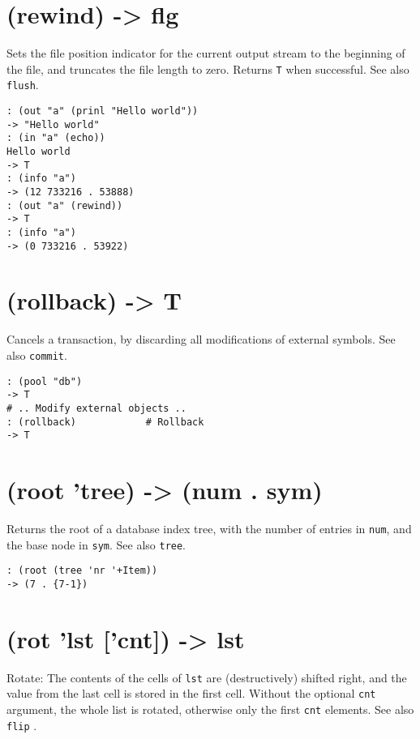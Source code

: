 {{{{{{{{ 
\section{(rewind) -> flg}
\label{sec-8-1-18-26}


Sets the file position indicator for the current output stream to the
beginning of the file, and truncates the file length to zero. Returns
\texttt{T} when successful. See also \texttt{flush}.


\begin{verbatim}
: (out "a" (prinl "Hello world"))
-> "Hello world"
: (in "a" (echo))
Hello world
-> T
: (info "a")
-> (12 733216 . 53888)
: (out "a" (rewind))
-> T
: (info "a")
-> (0 733216 . 53922)
\end{verbatim}

 
\section{(rollback) -> T}
\label{sec-8-1-18-27}


Cancels a transaction, by discarding all modifications of external
symbols. See also \texttt{commit}.


\begin{verbatim}
: (pool "db")
-> T
# .. Modify external objects ..
: (rollback)            # Rollback
-> T
\end{verbatim}

 
\section{(root 'tree) -> (num . sym)}
\label{sec-8-1-18-28}


Returns the root of a database index tree, with the number of entries in
\texttt{num}, and the base node in \texttt{sym}. See also \texttt{tree}.


\begin{verbatim}
: (root (tree 'nr '+Item))
-> (7 . {7-1})
\end{verbatim}

 
\section{(rot 'lst ['cnt]) -> lst}
\label{sec-8-1-18-29}


Rotate: The contents of the cells of \texttt{lst} are (destructively) shifted
right, and the value from the last cell is stored in the first cell.
Without the optional \texttt{cnt} argument, the whole list is rotated,
otherwise only the first \texttt{cnt} elements. See also \texttt{flip} .


}}}}}}}}
